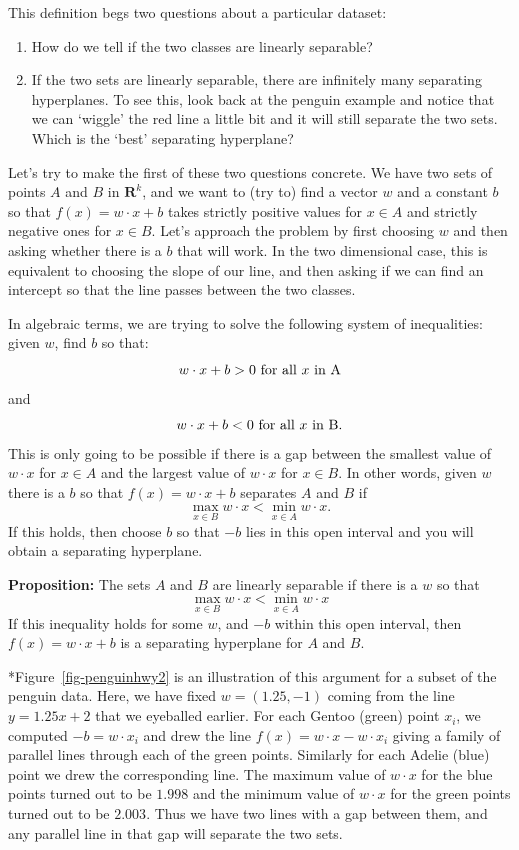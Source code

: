 \documentclass[
  11pt,
  letterpaper,
]{scrbook}
\providecommand{\tightlist}{%
  \setlength{\itemsep}{0pt}\setlength{\parskip}{0pt}}\usepackage{longtable,booktabs,array}
\theoremstyle{plain}
\theoremstyle{remark}
\begin{document}
This definition begs two questions about a particular dataset:

\begin{enumerate}
\def\labelenumi{\arabic{enumi}.}
\tightlist
\item
  How do we tell if the two classes are linearly separable?
\item
  If the two sets are linearly separable, there are infinitely many
  separating hyperplanes. To see this, look back at the penguin example
  and notice that we can `wiggle' the red line a little bit and it will
  still separate the two sets. Which is the `best' separating
  hyperplane?
\end{enumerate}

Let's try to make the first of these two questions concrete. We have two
sets of points \(A\) and \(B\) in \(\mathbf{R}^{k}\), and we want to
(try to) find a vector \(w\) and a constant \(b\) so that
\(f(x)=w\cdot x+b\) takes strictly positive values for \(x\in A\) and
strictly negative ones for \(x\in B\). Let's approach the problem by
first choosing \(w\) and then asking whether there is a \(b\) that will
work. In the two dimensional case, this is equivalent to choosing the
slope of our line, and then asking if we can find an intercept so that
the line passes between the two classes.

In algebraic terms, we are trying to solve the following system of
inequalities: given \(w\), find \(b\) so that: \[
w\cdot x+b>0 \hbox{ for all $x$ in A}
\] and \[
w\cdot x+b<0\hbox{ for all $x$ in B}.
\] This is only going to be possible if there is a gap between the
smallest value of \(w\cdot x\) for \(x\in A\) and the largest value of
\(w\cdot x\) for \(x\in B\). In other words, given \(w\) there is a
\(b\) so that \(f(x)=w\cdot x+b\) separates \(A\) and \(B\) if \[
\max_{x\in B}w\cdot x < \min_{x\in A} w\cdot x.
\] If this holds, then choose \(b\) so that \(-b\) lies in this open
interval and you will obtain a separating hyperplane.

\textbf{Proposition:} The sets \(A\) and \(B\) are linearly separable if
there is a \(w\) so that \[
\max_{x\in B}w\cdot x < \min_{x\in A} w\cdot x
\] If this inequality holds for some \(w\), and \(-b\) within this open
interval, then \(f(x)=w\cdot x+b\) is a separating hyperplane for \(A\)
and \(B\).

*Figure~\ref{fig-penguinhwy2} is an illustration of this argument for a
subset of the penguin data. Here, we have fixed \(w=(1.25,-1)\) coming
from the line \(y=1.25x+2\) that we eyeballed earlier. For each Gentoo
(green) point \(x_{i}\), we computed \(-b=w\cdot x_{i}\) and drew the
line \(f(x) = w\cdot x - w\cdot x_{i}\) giving a family of parallel
lines through each of the green points. Similarly for each Adelie (blue)
point we drew the corresponding line. The maximum value of \(w\cdot x\)
for the blue points turned out to be \(1.998\) and the minimum value of
\(w\cdot x\) for the green points turned out to be \(2.003\). Thus we
have two lines with a gap between them, and any parallel line in that
gap will separate the two sets.
\end{document}
